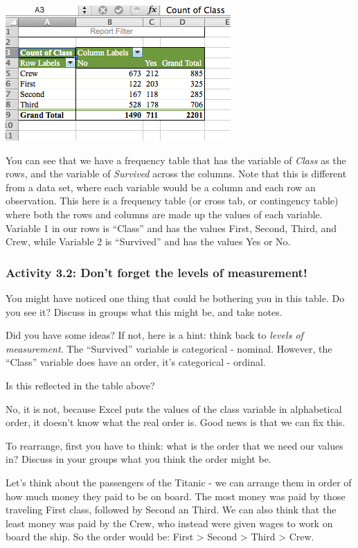 \documentclass[
]{book}
\begin{document}
\includegraphics{imgs/crosstabl_pivot.png}

You can see that we have a frequency table that has the variable of \emph{Class} as the rows, and the variable of \emph{Survived} across the columns. Note that this is different from a data set, where each variable would be a column and each row an observation. This here is a frequency table (or cross tab, or contingency table) where both the rows and columns are made up the values of each variable. Variable 1 in our rows is ``Class'' and has the values First, Second, Third, and Crew, while Variable 2 is ``Survived'' and has the values Yes or No.~

\hypertarget{activity-3.2-dont-forget-the-levels-of-measurement}{%
\subsubsection{Activity 3.2: Don't forget the levels of measurement!}\label{activity-3.2-dont-forget-the-levels-of-measurement}}

You might have noticed one thing that could be bothering you in this table. Do you see it? Discuss in groups what this might be, and take notes.

Did you have some ideas? If not, here is a hint: think back to \emph{levels of measurement}. The ``Survived'' variable is categorical - nominal. However, the ``Class'' variable does have an order, it's categorical - ordinal.

Is this reflected in the table above?

No, it is not, because Excel puts the values of the class variable in alphabetical order, it doesn't know what the real order is. Good news is that we can fix this.

To rearrange, first you have to think: what is the order that we need our values in? Discuss in your groups what you think the order might be.

Let's think about the passengers of the Titanic - we can arrange them in order of how much money they paid to be on board. The most money was paid by those traveling First class, followed by Second an Third. We can also think that the least money was paid by the Crew, who instead were given wages to work on board the ship. So the order would be: First \textgreater{} Second \textgreater{} Third \textgreater{} Crew.
\end{document}
